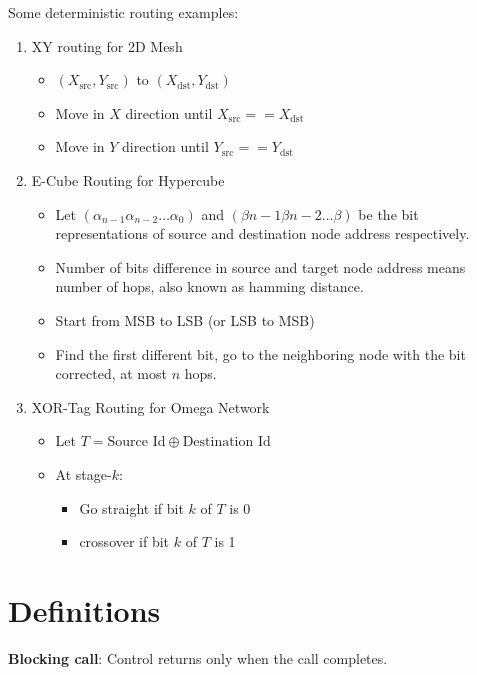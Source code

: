 \documentclass{article}
\begin{document}
Some deterministic routing examples:
\begin{enumerate}
    \item XY routing for 2D Mesh
          \begin{itemize}
              \item $\left( X_{\text{src}}, Y_{\text{src}}\right)$ to $\left( X_{\text{dst}}, Y_{\text{dst}}\right)$
              \item Move in $X$ direction until $X_{\text{src}} == X_{\text{dst}}$
              \item Move in $Y$ direction until $Y_{\text{src}} == Y_{\text{dst}}$
          \end{itemize}
    \item E-Cube Routing for Hypercube
          \begin{itemize}
              \item Let $\left( \alpha_{n-1} \alpha_{n-2} \dots \alpha_0 \right)$ and $\left( \beta{n-1} \beta{n-2} \dots \beta\right)$ be the bit representations of source and destination node address respectively.
              \item Number of bits difference in source and target node address means number of hops, also known as hamming distance.
              \item Start from MSB to LSB (or LSB to MSB)
              \item Find the first different bit, go to the neighboring node with the bit corrected, at most $n$ hops.
          \end{itemize}
    \item XOR-Tag Routing for Omega Network
          \begin{itemize}
              \item Let $T = \text{Source Id} \oplus \text{Destination Id}$
              \item At stage-$k$:
                    \begin{itemize}
                        \item Go straight if bit $k$ of $T$ is 0
                        \item crossover if bit $k$ of $T$ is 1
                    \end{itemize}
          \end{itemize}
\end{enumerate}


\section{Definitions}
\textbf{Blocking call}: Control returns only when the call completes.
\end{document}
